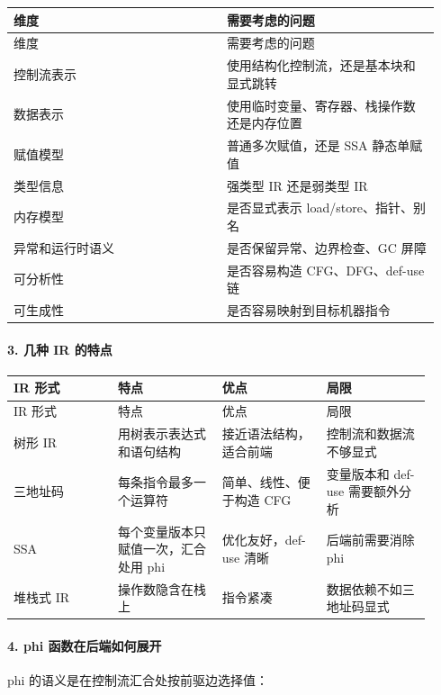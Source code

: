 \documentclass[UTF8]{ctexart}
\begin{document}
\begin{longtable}{|p{0.47\linewidth}|p{0.47\linewidth}|}
\hline
维度 & 需要考虑的问题 \\
\hline
\endfirsthead
维度 & 需要考虑的问题 \\
\hline
\endhead
控制流表示 & 使用结构化控制流，还是基本块和显式跳转 \\
\hline
数据表示 & 使用临时变量、寄存器、栈操作数还是内存位置 \\
\hline
赋值模型 & 普通多次赋值，还是 SSA 静态单赋值 \\
\hline
类型信息 & 强类型 IR 还是弱类型 IR \\
\hline
内存模型 & 是否显式表示 load/store、指针、别名 \\
\hline
异常和运行时语义 & 是否保留异常、边界检查、GC 屏障 \\
\hline
可分析性 & 是否容易构造 CFG、DFG、def-use 链 \\
\hline
可生成性 & 是否容易映射到目标机器指令 \\
\hline
\end{longtable}

\paragraph*{3. 几种 IR 的特点}

\begin{longtable}{|p{0.23\linewidth}|p{0.23\linewidth}|p{0.23\linewidth}|p{0.23\linewidth}|}
\hline
IR 形式 & 特点 & 优点 & 局限 \\
\hline
\endfirsthead
IR 形式 & 特点 & 优点 & 局限 \\
\hline
\endhead
树形 IR & 用树表示表达式和语句结构 & 接近语法结构，适合前端 & 控制流和数据流不够显式 \\
\hline
三地址码 & 每条指令最多一个运算符 & 简单、线性、便于构造 CFG & 变量版本和 def-use 需要额外分析 \\
\hline
SSA & 每个变量版本只赋值一次，汇合处用 phi & 优化友好，def-use 清晰 & 后端前需要消除 phi \\
\hline
堆栈式 IR & 操作数隐含在栈上 & 指令紧凑 & 数据依赖不如三地址码显式 \\
\hline
\end{longtable}

\paragraph*{4. phi 函数在后端如何展开}

phi 的语义是在控制流汇合处按前驱边选择值：
\end{document}
